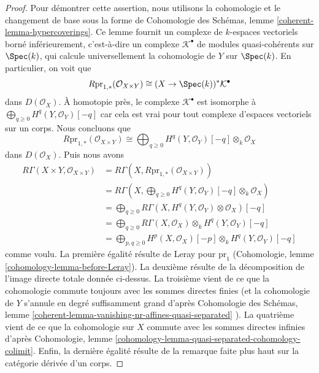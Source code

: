 \begin{proof}
\medskip\noindent
 Pour démontrer cette assertion, nous utilisons la cohomologie et le changement de base sous
la forme de Cohomologie des Schémas, lemme \ref{coherent-lemma-hypercoverings}.
Ce lemme fournit un complexe de $k$-espaces vectoriels borné inférieurement, c'est-à-dire
un complexe $\mathcal{K}^\bullet$ de modules quasi-cohérents sur $\Spec(k)$,
qui calcule universellement la cohomologie de $Y$ sur $\Spec(k)$.
En particulier, on voit que 
$$
R\text{pr}_{1, *}(\mathcal{O}_{X \times Y}) \cong
(X \to \Spec(k))^*\mathcal{K}^\bullet
$$
 dans $D(\mathcal{O}_X)$. À homotopie près, le complexe $\mathcal{K}^\bullet$
 est isomorphe à $\bigoplus_{q \geq 0} H^q(Y, \mathcal{O}_Y)[-q]$ car
cela est vrai pour tout complexe d'espaces vectoriels sur un corps.
Nous concluons que 
$$
R\text{pr}_{1, *}(\mathcal{O}_{X \times Y}) \cong
\bigoplus\nolimits_{q \geq 0}
H^q(Y, \mathcal{O}_Y)[-q] \otimes_k \mathcal{O}_X
$$
 dans $D(\mathcal{O}_X)$. Puis nous avons 
\begin{align*}
R\Gamma(X \times Y, \mathcal{O}_{X \times Y})
& =
R\Gamma(X, R\text{pr}_{1, *}(\mathcal{O}_{X \times Y})) \\
& =
R\Gamma(X, \bigoplus\nolimits_{q \geq 0}
H^q(Y, \mathcal{O}_Y)[-q] \otimes_k \mathcal{O}_X) \\
& =
\bigoplus\nolimits_{q \geq 0}
R\Gamma(X,  H^q(Y, \mathcal{O}_Y) \otimes \mathcal{O}_X)[-q] \\
& =
\bigoplus\nolimits_{q \geq 0}
R\Gamma(X, \mathcal{O}_X) \otimes_k H^q(Y, \mathcal{O}_Y)[-q] \\
& =
\bigoplus\nolimits_{p, q \geq 0}
H^p(X, \mathcal{O}_X)[-p] \otimes_k H^q(Y, \mathcal{O}_Y)[-q]
\end{align*}
 comme voulu. La première égalité résulte de Leray pour $\text{pr}_1$
 (Cohomologie, lemme \ref{cohomology-lemma-before-Leray}).
La deuxième résulte de la décomposition de l'image directe totale donnée ci-dessus. La
troisième vient de ce que la cohomologie commute toujours avec les sommes directes finies (et
la cohomologie de $Y$ s'annule en degré suffisamment grand d'après
Cohomologie des Schémas, lemme 
\ref{coherent-lemma-vanishing-nr-affines-quasi-separated} ).
La quatrième vient de ce que la cohomologie sur $X$ commute avec les sommes
directes infinies d'après Cohomologie, lemme 
\ref{cohomology-lemma-quasi-separated-cohomology-colimit}.
Enfin, la dernière égalité résulte de la remarque faite plus haut sur la catégorie dérivée
d'un corps. 
\end{proof}








